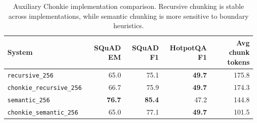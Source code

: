 \begin{table}[t]
\centering
\small
\begin{tabular}{lrrrr}
\toprule
System & SQuAD EM & SQuAD F1 & HotpotQA F1 & Avg chunk tokens \\
\midrule
\texttt{recursive\_256} & 65.0 & 75.1 & \textbf{49.7} & 175.8 \\
\texttt{chonkie\_recursive\_256} & 66.7 & 75.9 & \textbf{49.7} & 174.3 \\
\texttt{semantic\_256} & \textbf{76.7} & \textbf{85.4} & 47.2 & 144.8 \\
\texttt{chonkie\_semantic\_256} & 65.0 & 77.1 & \textbf{49.7} & 101.5 \\
\bottomrule
\end{tabular}
\caption{Auxiliary Chonkie implementation comparison. Recursive chunking is stable across implementations, while semantic chunking is more sensitive to boundary heuristics.}
\label{tab:chonkie}
\end{table}
